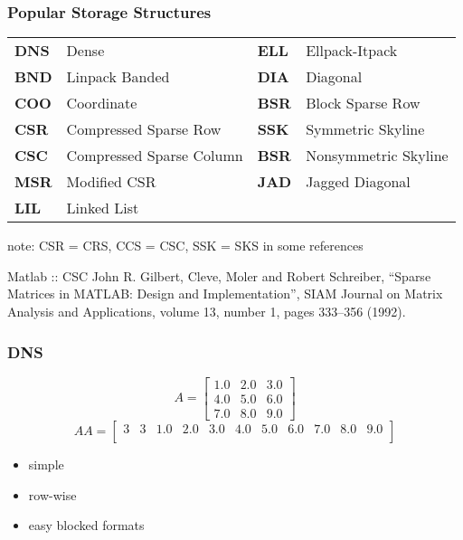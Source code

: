 \documentclass[10pt]{beamer}
\begin{document}
\begin{frame}
\frametitle{Popular Storage Structures}
\begin{center}
\begin{tabular}{l l l l}
  {\bf DNS} & Dense                    & {\bf ELL} & Ellpack-Itpack\\
  {\bf BND} & Linpack Banded           & {\bf DIA} & Diagonal\\
  {\bf COO} & Coordinate               & {\bf BSR} & Block Sparse Row\\
  {\bf CSR} & Compressed Sparse Row    & {\bf SSK} & Symmetric Skyline\\
  {\bf CSC} & Compressed Sparse Column & {\bf BSR} & Nonsymmetric Skyline\\
  {\bf MSR} & Modified CSR             & {\bf JAD} & Jagged Diagonal\\
  {\bf LIL} & Linked List              & \\
\end{tabular}
\end{center}
\bigskip
note: CSR = CRS, CCS = CSC, SSK = SKS in some references

\begin{block}{Matlab :: CSC}
     John R. Gilbert, Cleve, Moler and Robert Schreiber,
 “Sparse Matrices in MATLAB: Design and Implementation”,
 SIAM Journal on Matrix Analysis and Applications, volume
 13, number 1, pages 333–356 (1992).
\end{block}
\end{frame}
\begin{frame}[fragile]
\frametitle{DNS}
\begin{equation*}
A=
\begin{bmatrix}
1.0 & 2.0 & 3.0\\
4.0 & 5.0 & 6.0\\
7.0 & 8.0 & 9.0
\end{bmatrix}
\end{equation*}
\begin{equation*}
  AA = 
\begin{bmatrix}
3 & 3 & 1.0 & 2.0 & 3.0 & 4.0 & 5.0 & 6.0 & 7.0 & 8.0 & 9.0 \\
\end{bmatrix}
\end{equation*}
  \begin{itemize}
    \item simple
    \item row-wise
    \item easy blocked formats
  \end{itemize}
\end{frame}
\end{document}
